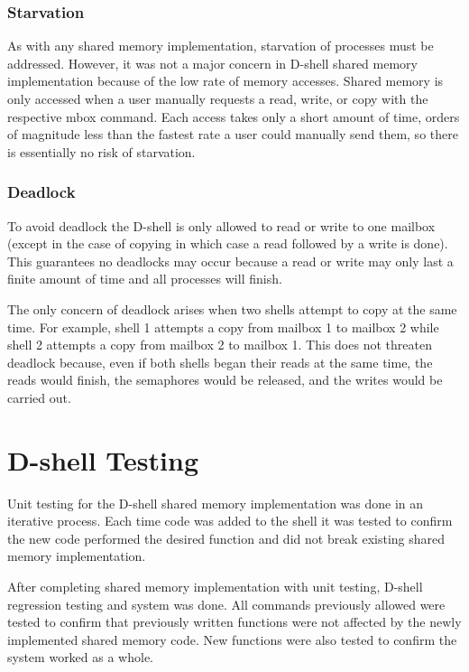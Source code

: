 \documentclass[11pt]{article}
\begin{document}
\begin{multicols}{2}
\subsubsection{Starvation}
As with any shared memory implementation, starvation of processes must be addressed. However, it was not a major concern in D-shell shared memory implementation because of the low rate of memory accesses. Shared memory is only accessed when a user manually requests a read, write, or copy with the respective mbox command. Each access takes only a short amount of time, orders of magnitude less than the fastest rate a user could manually send them, so there is essentially no risk of starvation.

\subsubsection{Deadlock}
To avoid deadlock the D-shell is only allowed to read or write to one mailbox (except in the case of copying in which case a read followed by a write is done). This guarantees no deadlocks may occur because a read or write may only last a finite amount of time and all processes will finish.

The only concern of deadlock arises when two shells attempt to copy at the same time. For example, shell 1 attempts a copy from mailbox 1 to mailbox 2 while shell 2 attempts a copy from mailbox 2 to mailbox 1. This does not threaten deadlock because, even if both shells began their reads at the same time, the reads would finish, the semaphores would be released, and the writes would be carried out.


\section{D-shell Testing}\label{testing}
Unit testing for the D-shell shared memory implementation was done in an iterative process. Each time code was added to the shell it was tested to confirm the new code performed the desired function and did not break existing shared memory implementation. 

After completing shared memory implementation with unit testing, D-shell regression testing and system was done. All commands previously allowed were tested to confirm that previously written functions were not affected by the newly implemented shared memory code. New functions were also tested to confirm the system worked as a whole. 


\end{multicols}
\end{document}
